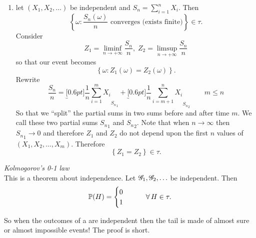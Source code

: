 \documentclass{report}
\begin{document}
\begin{example}
\begin{enumerate}[\circnum]
\begin{figure}[H]
		\end{figure}
		Now we choose a different $\tilde{\omega}$ such that:
		\[X(\tilde{\omega})=(\color{SkyBlue4}+1,+1,+1,\color{black}+1,-1,+1,-1,\ldots)\]
		So in this case we have a ``ramp'' before the oscillation: $\tilde{\omega}\notin\left\{\omega:S_n(\omega)=0\io\right\}$! Try to make the same drawing: the walk will go up and the 0 will never be visited!\\
		Observe that $\omega$ and $\tilde{\omega}$ agree from the fourth coordinate on: but this means that the first events are decisive when it comes to determine whether a certain $\omega$ belongs to $\left\{\omega:S_n(\omega)=0\io\right\}$. This means that
		\[\left\{\omega:S_n(\omega)=0\io\right\}\notin\underbrace{\sigma(X_4,X_5,X_6,\ldots)}_{\mathclap{\text{\scriptsize We need more information to decide!}}}\implies\notin\tau_3\]
		So of course $\left\{\omega:S_n(\omega)=0\io\right\}\notin\tau$. The nature of the event is changed by a finite number of occurences...
		\item let $(X_1,X_2,\ldots)$ be independent and $S_n=\sum_{i=1}^{n}X_i$. Then
		\[\left\{\omega:\frac{S_n(\omega)}{n}\text{ converges (exists finite)}\right\}\in\tau.\]
		Consider 
		\[Z_1=\liminf_{n\to+\infty}\frac{S_n}{n},\;Z_2=\limsup_{n\to+\infty}\frac{S_n}{n}\]
		so that our event becomes
		\[\left\{\omega:Z_1(\omega)=Z_2(\omega)\right\}.\]
		Rewrite 
		\[ \frac{S_n}{n}=\underbracket[0.6pt]{\frac{1}{n}\sum_{i=1}^{m}X_i}_{{S_n}_1}+\underbracket[0.6pt]{\frac{1}{n}\sum_{i=m+1}^{n}X_i}_{{S_n}_2}\qquad m\leq n\]
		So that we ``split'' the partial sums in two sums before and after time $m$. We call these two partial sums ${S_n}_1$ and ${S_n}_2$. Note that when $n\to\infty$ then ${S_n}_1\to0$ and therefore $Z_1$ and $Z_2$ do not depend upon the first $n$ values of $(X_1,X_2,\ldots,X_m)$. Therefore 
		\[\left\{Z_1=Z_2\right\}\in\tau.\]
 	\end{enumerate}
\end{example}
\begin{theorem}
	\emph{Kolmogorov's 0-1 law}\\
	This is a theorem about independence. Let $\mathscr{G}_1,\mathscr{G}_2,\ldots$ be independent. Then
	\[\mathbb{P}(H)=\begin{cases}
		0\\
		1
	\end{cases}\qquad\forall\, H\in\tau.\]
\end{theorem}
So when the outcomes of a \rv{} are independent then the tail is made of almost sure or almost impossible events! The proof is short.
\end{document}
